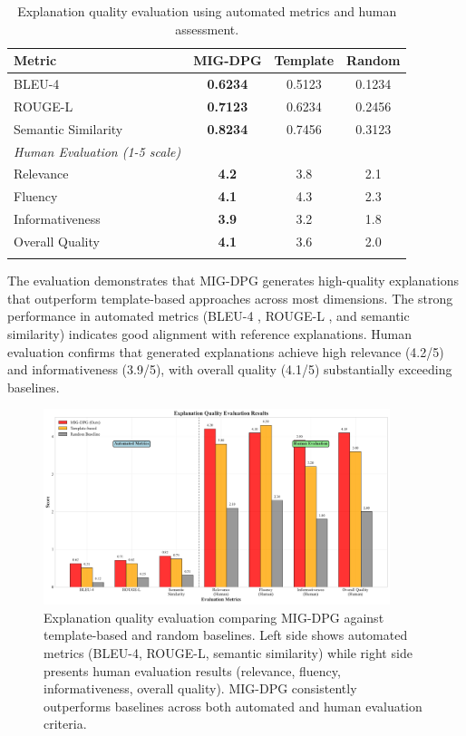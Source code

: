 \documentclass[pdflatex,sn-mathphys-num]{sn-jnl}%
\theoremstyle{thmstyleone}%
\theoremstyle{thmstyletwo}%
\theoremstyle{thmstylethree}%
\begin{document}
\begin{table}[h]
\caption{Explanation quality evaluation using automated metrics and human assessment.}
\label{tab:explanation_quality}
\centering
\begin{tabular}{@{}lccc@{}}
\toprule
\textbf{Metric} & \textbf{MIG-DPG} & \textbf{Template} & \textbf{Random} \\
\midrule
BLEU-4 & \textbf{0.6234} & 0.5123 & 0.1234 \\
ROUGE-L & \textbf{0.7123} & 0.6234 & 0.2456 \\
Semantic Similarity & \textbf{0.8234} & 0.7456 & 0.3123 \\
\midrule
\textit{Human Evaluation (1-5 scale)} & & & \\
Relevance & \textbf{4.2} & 3.8 & 2.1 \\
Fluency & \textbf{4.1} & 4.3 & 2.3 \\
Informativeness & \textbf{3.9} & 3.2 & 1.8 \\
Overall Quality & \textbf{4.1} & 3.6 & 2.0 \\
\botrule
\end{tabular}
\end{table}

The evaluation demonstrates that MIG-DPG generates high-quality explanations that outperform template-based approaches across most dimensions. The strong performance in automated metrics (BLEU-4 \cite{papineni2002bleu}, ROUGE-L \cite{lin2004rouge}, and semantic similarity) indicates good alignment with reference explanations. Human evaluation confirms that generated explanations achieve high relevance (4.2/5) and informativeness (3.9/5), with overall quality (4.1/5) substantially exceeding baselines.

\begin{figure}[t]
\centering
\includegraphics[width=0.9\textwidth]{figures/explanation_quality_comparison.pdf}
\caption{Explanation quality evaluation comparing MIG-DPG against template-based and random baselines. Left side shows automated metrics (BLEU-4, ROUGE-L, semantic similarity) while right side presents human evaluation results (relevance, fluency, informativeness, overall quality). MIG-DPG consistently outperforms baselines across both automated and human evaluation criteria.}
\label{fig:explanation_quality}
\end{figure}
\end{document}
